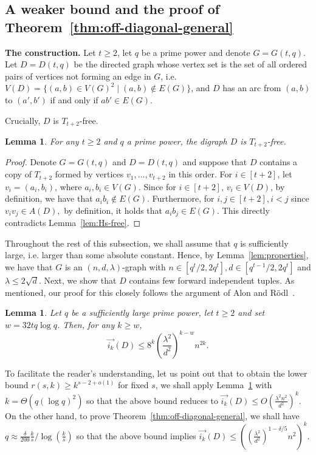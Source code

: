 \documentclass{article}
\theoremstyle{plain}
\newtheorem{lemma}[theorem]{Lemma}
\theoremstyle{definition}
\newcommand{\fwi}[1]{\overrightarrow{i_{#1}}}
\begin{document}
\subsection{A weaker bound and the proof of Theorem~\ref{thm:off-diagonal-general}} \label{subsec:old}

\textbf{The construction.}
Let $t \ge 2$, let $q$ be a prime power and denote $G = G(t, q)$. Let $D = D(t, q)$ be the directed graph whose vertex set is the set of all ordered pairs of vertices not forming an edge in $G$, i.e. $V(D) = \{ (a, b) \in V(G)^2 \mid (a, b) \not\in E(G) \}$, and $D$ has an arc from $(a, b)$ to $(a', b')$ if and only if $ab' \in E(G)$. 

Crucially, $D$ is $T_{t+2}$-free.
\begin{lemma} \label{lem:t+2-free}
    For any $t \ge 2$ and $q$ a prime power, the digraph $D$ is $T_{t+2}$-free.
\end{lemma}
\begin{proof}
    Denote $G = G(t, q)$ and $D = D(t, q)$ and suppose that $D$ contains a copy of $T_{t+2}$ formed by vertices $v_1, \dots, v_{t+2}$ in this order. For $i \in [t+2]$, let $v_i = (a_i, b_i)$, where $a_i, b_i \in V(G)$. Since for $i \in [t+2]$, $v_i \in V(D)$, by definition, we have that $a_i b_i \not\in E(G)$. Furthermore, for $i, j \in [t+2], i < j$ since $v_i v_j \in A(D),$ by definition, it holds that $a_i b_j \in E(G)$. This directly contradicts Lemma~\ref{lem:Hs-free}.
\end{proof}

Throughout the rest of this subsection, we shall assume that $q$ is sufficiently large, i.e. larger than some absolute constant. Hence, by Lemma~\ref{lem:properties}, we have that $G$ is an $(n, d, \lambda)$-graph with $n \in [q^t / 2, 2q^t], d \in [q^{t-1} / 2, 2q^t]$ and $\lambda \le 2 \sqrt{d}$.
Next, we show that $D$ contains few forward independent tuples. As mentioned, our proof for this closely follows the argument of Alon and R\"{o}dl~\cite{alon-rodl}.

\begin{lemma} \label{lem:old-fw-indep-counting}
    Let $q$ be a sufficiently large prime power, let $t \ge 2$ and set $w = 32 t q \log q$. Then, for any $k \ge w$,
    \[ \fwi{k}(D) \le 8^k \left(\frac{\lambda^2}{d^2}\right)^{k-w}  n^{2k}. \]
\end{lemma}
To facilitate the reader's understanding, let us point out that to obtain the lower bound $r(s, k) \ge k^{s-2+o(1)}$ for fixed $s$, we shall apply Lemma~\ref{lem:old-fw-indep-counting} with $k = \Theta(q (\log q)^2)$ so that the above bound reduces to $\fwi{k}(D) \le O\left( \frac{\lambda^2 n^2}{d^2} \right)^k$. On the other hand, to prove Theorem~\ref{thm:off-diagonal-general}, we shall have $q \approx \frac{\delta}{200} \frac{k}{s} / \log\left( \frac{k}{s}\right)$ so that the above bound implies $\fwi{k}(D) \le \left(\left(\frac{\lambda^2}{d^2}\right)^{1 - \delta/5} n^2\right)^k$.
\end{document}
